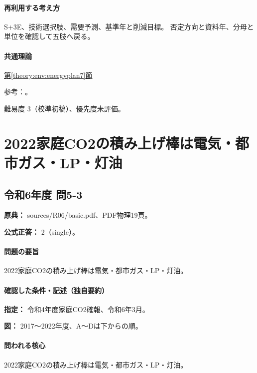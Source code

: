 \paragraph{再利用する考え方} S+3E、技術選択肢、需要予測、基準年と削減目標。 否定方向と資料年、分母と単位を確認して五肢へ戻る。

\paragraph{共通理論} \hyperref[theory:env:energyplan7]{第\ref*{theory:env:energyplan7}節}

\par 参考：\cite{env60_plan7}。

\par 難易度 3（校準初稿）、優先度未評価。

\section{2022家庭CO2の積み上げ棒は電気・都市ガス・LP・灯油}

\subsection{令和6年度 問5-3}
\label{q:r06-reg-basic-5-3}

\noindent\textbf{原典：} sources/R06/basic.pdf、PDF物理19頁。

\textbf{公式正答：} 2（single）。

\paragraph{問題の要旨} 2022家庭CO2の積み上げ棒は電気・都市ガス・LP・灯油。

\paragraph{確認した条件・記述（独自要約）}\mbox{}\par

\noindent\textbf{指定：} 令和4年度家庭CO2確報、令和6年3月。\par

\noindent\textbf{図：} 2017〜2022年度、A〜Dは下からの順。\par

\paragraph{問われる核心} 2022家庭CO2の積み上げ棒は電気・都市ガス・LP・灯油。


